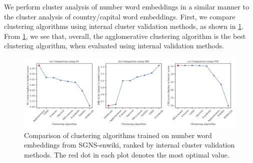 We perform cluster analysis of number word embeddings in a similar manner to the cluster analysis of country/capital word embeddings. First, we compare clustering algorithms using internal cluster validation methods, as shown in \cref{fig:cluster-analysis-numbers-word-group-internal-cluster-validation}. From \cref{fig:cluster-analysis-numbers-word-group-internal-cluster-validation}, we see that, overall, the agglomerative clustering algorithm is the best clustering algorithm, when evaluated using internal validation methods.
\begin{figure}[H]
    \centering
    \includegraphics[width=\textwidth]{thesis/figures/cluster-analysis-numbers-word-group-internal-cluster-validation.pdf}
    \caption{Comparison of clustering algorithms trained on number word embeddings from SGNS-enwiki, ranked by internal cluster validation methods. The red dot in each plot denotes the most optimal value.}
    \label{fig:cluster-analysis-numbers-word-group-internal-cluster-validation}
\end{figure}

